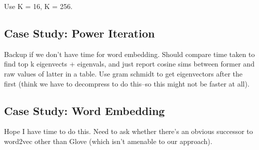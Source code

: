 Use K = 16, K = 256.

\subsection{Case Study: Power Iteration}

Backup if we don't have time for word embedding. Should compare time taken to find top k eigenvects + eigenvals, and just report cosine sims between former and raw values of latter in a table. Use gram schmidt to get eigenvectors after the first (think we have to decompress to do this--so this might not be faster at all).

\subsection{Case Study: Word Embedding}

Hope I have time to do this. Need to ask whether there's an obvious successor to word2vec other than Glove (which isn't amenable to our approach).












